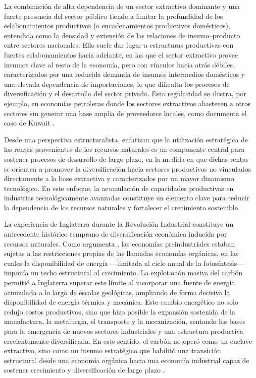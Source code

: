 \documentclass[../../PTFM.tex]{subfiles}
\begin{document}
	La combinación de alta dependencia de un sector extractivo dominante y una fuerte presencia del sector público tiende a limitar la profundidad de los eslabonamientos productivos (o encadenamientos productivos domésticos), entendida como la densidad y extensión de las relaciones de insumo--producto entre sectores nacionales. Ello suele dar lugar a estructuras productivas con fuertes eslabonamientos hacia adelante, en las que el sector extractivo provee insumos clave al resto de la economía, pero con vínculos hacia atrás débiles, caracterizados por una reducida demanda de insumos intermedios domésticos y una elevada dependencia de importaciones, lo que dificulta los procesos de diversificación y el desarrollo del sector privado. Esta regularidad se ilustra, por ejemplo, en economías petroleras donde los sectores extractivos abastecen a otros sectores sin generar una base amplia de proveedores locales, como documenta el caso de Kuwait \parencite{Gelan2021}.
	
	Desde una perspectiva estructuralista, \textcite{Chang2007} enfatizan que la utilización estratégica de las rentas provenientes de los recursos naturales es un componente central para sostener procesos de desarrollo de largo plazo, en la medida en que dichas rentas se orienten a promover la diversificación hacia sectores productivos no vinculados directamente a la base extractiva y caracterizados por un mayor dinamismo tecnológico. En este enfoque, la acumulación de capacidades productivas en industrias tecnológicamente avanzadas constituye un elemento clave para reducir la dependencia de los recursos naturales y fortalecer el crecimiento sostenible.	
	
	La experiencia de Inglaterra durante la Revolución Industrial constituye un antecedente histórico temprano de diversificación económica inducida por recursos naturales. Como argumenta \textcite{Wrigley2013}, las economías preindustriales estaban sujetas a las restricciones propias de las llamadas economías orgánicas, en las cuales la disponibilidad de energía —limitada al ciclo anual de la fotosíntesis— imponía un techo estructural al crecimiento. La explotación masiva del carbón permitió a Inglaterra superar este límite al incorporar una fuente de energía acumulada a lo largo de escalas geológicas, ampliando de forma decisiva la disponibilidad de energía térmica y mecánica. Este cambio energético no solo redujo costos productivos, sino que hizo posible la expansión sostenida de la manufactura, la metalurgia, el transporte y la mecanización, sentando las bases para la emergencia de nuevos sectores industriales y una estructura productiva crecientemente diversificada. En este sentido, el carbón no operó como un enclave extractivo, sino como un insumo estratégico que habilitó una transición estructural desde una economía orgánica hacia una economía industrial capaz de sostener crecimiento y diversificación de largo plazo \parencite{Wrigley2013}.
	
\end{document}
